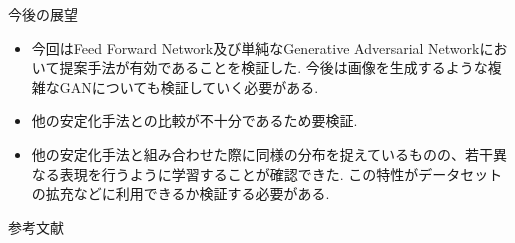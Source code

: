 \documentclass[dvipdfmx,12pt,unicode]{beamer}
\begin{document}
\begin{frame}{今後の展望}
  \begin{itemize}
  \item 今回はFeed Forward Network及び単純なGenerative Adversarial Networkにおいて提案手法が有効であることを検証した.
    今後は画像を生成するような複雑なGANについても検証していく必要がある.
  \item 他の安定化手法との比較が不十分であるため要検証.
  \item 他の安定化手法と組み合わせた際に同様の分布を捉えているものの、若干異なる表現を行うように学習することが確認できた.
    この特性がデータセットの拡充などに利用できるか検証する必要がある.
  \end{itemize}
\end{frame}

\begin{frame}[allowframebreaks]{参考文献}
  \beamertemplatetextbibitems


\end{frame}
\end{document}
